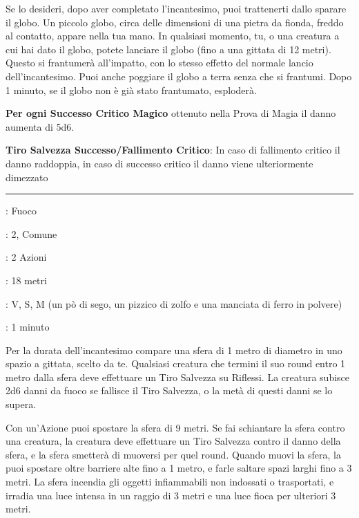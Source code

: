 \begin{multicols}{2}
Se lo desideri, dopo aver completato l'incantesimo, puoi trattenerti dallo sparare il globo. Un piccolo globo, circa delle dimensioni di una pietra da fionda, freddo al contatto, appare nella tua mano. In qualsiasi momento, tu, o una creatura a cui hai dato il globo, potete lanciare il globo (fino a una gittata di 12 metri). Questo si frantumerà all'impatto, con lo stesso effetto del normale lancio dell'incantesimo. Puoi anche poggiare il globo a terra senza che si frantumi. Dopo 1 minuto, se il globo non è già stato frantumato, esploderà.

\textbf{Per ogni Successo Critico Magico} ottenuto nella Prova di Magia il danno aumenta di 5d6.

\textbf{Tiro Salvezza Successo/Fallimento Critico}: In caso di fallimento critico il danno raddoppia, in caso di successo critico il danno viene ulteriormente dimezzato

\smallskip\noindent\rule{\linewidth}{2pt} \hypertarget{Sfera Infuocata}{}\medskip{}
\noindent
\begin{description}[noitemsep, topsep=0pt, parsep=0pt, partopsep=0pt, leftmargin=0cm, labelwidth=2.8cm]
	\item[\textbf{Lista di Magia}]: Fuoco
	\item[\textbf{Livello}]: 2, Comune
	\item[\textbf{T. di Lancio}]: 2 Azioni
	\item[\textbf{Gittata}]: 18 metri
	\item[\textbf{Componenti}]: V, S, M (un pò di sego, un pizzico di zolfo e una manciata di ferro in polvere)
	\item[\textbf{Durata}]: 1 minuto
\end{description}

Per la durata dell'incantesimo compare una sfera di 1 metro di diametro in uno spazio a gittata, scelto da te. Qualsiasi creatura che termini il suo round entro 1 metro dalla sfera deve effettuare un Tiro Salvezza su Riflessi. La creatura subisce 2d6 danni da fuoco se fallisce il Tiro Salvezza, o la metà di questi danni se lo supera.

Con un'Azione puoi spostare la sfera di 9 metri. Se fai schiantare la sfera contro una creatura, la creatura deve effettuare un Tiro Salvezza contro il danno della sfera, e la sfera smetterà di muoversi per quel round.
Quando muovi la sfera, la puoi spostare oltre barriere alte fino a 1 metro, e farle saltare spazi larghi fino a 3 metri. La sfera incendia gli oggetti infiammabili non indossati o trasportati, e irradia una luce intensa in un raggio di 3 metri e una luce fioca per ulteriori 3 metri.


\end{multicols}
